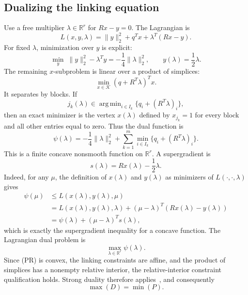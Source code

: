 \documentclass[12pt]{article}
\newcommand{\R}{\mathbb{R}}
\newcommand{\Kset}{\mathcal{K}}
\DeclareMathOperator*{\argmin}{arg\,min}
\begin{document}
\subsection{Dualizing the linking equation}
Use a free multiplier $\lambda\in\R^r$ for $Rx-y=0$.  The Lagrangian is
\begin{equation}
L(x,y,\lambda)=\|y\|_2^2+q^Tx+\lambda^T(Rx-y).
\end{equation}
For fixed $\lambda$, minimization over $y$ is explicit:
\begin{equation}
\min_y \; \|y\|_2^2-\lambda^Ty
= -\frac14\|\lambda\|_2^2,
\qquad y(\lambda)=\frac12\lambda.
\label{eq:y-subproblem}
\end{equation}
The remaining $x$-subproblem is linear over a product of simplices:
\begin{equation}
\min_{x\in\Kset} (q+R^T\lambda)^Tx.
\label{eq:x-subproblem}
\end{equation}
It separates by blocks.  If
\begin{equation}
 j_k(\lambda)\in\argmin_{i\in I_k}\{q_i+(R^T\lambda)_i\},
\label{eq:block-oracle}
\end{equation}
then an exact minimizer is the vertex $x(\lambda)$ defined by $x_{j_k}=1$ for every block and all other entries equal to zero.  Thus the dual function is
\begin{equation}
\psi(\lambda)
= -\frac14\|\lambda\|_2^2
+\sum_{k=1}^m \min_{i\in I_k}\{q_i+(R^T\lambda)_i\}.
\label{eq:dual}
\end{equation}
This is a finite concave nonsmooth function on $\R^r$.  A supergradient is
\begin{equation}
 s(\lambda)=Rx(\lambda)-\frac12\lambda.
\label{eq:supergradient}
\end{equation}
Indeed, for any $\mu$, the definition of $x(\lambda)$ and $y(\lambda)$ as minimizers of $L(\cdot,\cdot,\lambda)$ gives
\begin{align}
\psi(\mu)&\le L(x(\lambda),y(\lambda),\mu) \\
&= L(x(\lambda),y(\lambda),\lambda) + (\mu-\lambda)^T(Rx(\lambda)-y(\lambda)) \\
&= \psi(\lambda)+(\mu-\lambda)^Ts(\lambda),
\end{align}
which is exactly the supergradient inequality for a concave function.  The Lagrangian dual problem is
\begin{equation}
\tag{D}
\max_{\lambda\in\R^r}\psi(\lambda).
\end{equation}
Since (PR) is convex, the linking constraints are affine, and the product of simplices has a nonempty relative interior, the relative-interior constraint qualification holds. Strong duality therefore applies~\cite{boyd2004convex}, and consequently \[ \max(D)=\min(P). \]
\end{document}
